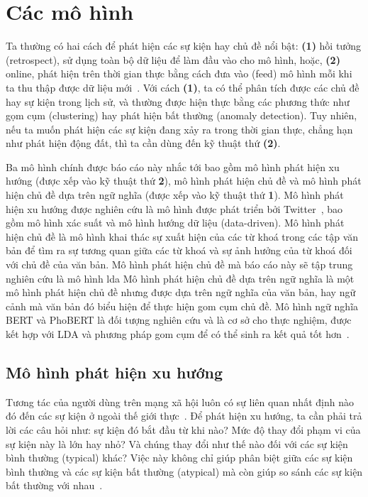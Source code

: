 \chapter{Các mô hình}
\label{chap:models}

Ta thường có hai cách để phát hiện các sự kiện hay chủ đề nổi bật: \textbf{(1)} hồi tưởng (retrospect), sử dụng toàn bộ dữ liệu để làm đầu vào cho mô hình, hoặc, \textbf{(2)} online, phát hiện trên thời gian thực bằng cách đưa vào (feed) mô hình mỗi khi ta thu thập được dữ liệu mới~\cite{lauOnlineTrendAnalysis2012}. Với cách \textbf{(1)}, ta có thể phân tích được các chủ đề hay sự kiện trong lịch sử, và thường được hiện thực bằng các phương thức như gọm cụm (clustering) hay phát hiện bất thường (anomaly detection). Tuy nhiên, nếu ta muốn phát hiện các sự kiện đang xảy ra trong thời gian thực, chẳng hạn như phát hiện động đất, thì ta cần dùng đến kỹ thuật thứ \textbf{(2)}.

Ba mô hình chính được báo cáo này nhắc tới bao gồm mô hình phát hiện xu hướng (được xếp vào kỹ thuật thứ \textbf{2}), mô hình phát hiện chủ đề và mô hình phát hiện chủ đề dựa trên ngữ nghĩa (được xếp vào kỹ thuật thứ \textbf{1}).  Mô hình phát hiện xu hướng được nghiên cứu là mô hình được phát triển bởi Twitter~\cite{hendricksonTrendDetectionSocial2015}, bao gồm mô hình xác suất và mô hình hướng dữ liệu (data-driven). Mô hình phát hiện chủ đề là mô hình khai thác sự xuất hiện của các từ khoá trong các tập văn bản để tìm ra sự tương quan giữa các từ khoá và sự ảnh hưởng của từ khoá đối với chủ đề của văn bản. Mô hình phát hiện chủ đề mà báo cáo này sẽ tập trung nghiên cứu là mô hình \acrfull{lda} Mô hình phát hiện chủ đề dựa trên ngữ nghĩa là một mô hình phát hiện chủ đề nhưng được dựa trên ngữ nghĩa của văn bản, hay ngữ cảnh mà văn bản đó biểu hiện để thực hiện gom cụm chủ đề. Mô hình ngữ nghĩa BERT và PhoBERT là đối tượng nghiên cứu và là cơ sở cho thực nghiệm, được kết hợp với LDA và phương pháp gom cụm để có thể sinh ra kết quả tốt hơn~\cite{lamGomCumVan2021}.



\section{Mô hình phát hiện xu hướng}
Tương tác của người dùng trên mạng xã hội luôn có sự liên quan nhất định nào đó đến các sự kiện ở ngoài thế giới thực~\cite{hendricksonTrendDetectionSocial2015}. Để phát hiện xu hướng, ta cần phải trả lời các câu hỏi như: sự kiện đó bắt đầu từ khi nào? Mức độ thay đổi phạm vi của sự kiện này là lớn hay nhỏ? Và chúng thay đổi như thế nào đối với các sự kiện bình thường (typical) khác? Việc này không chỉ giúp phân biệt giữa các sự kiện bình thường và các sự kiện bất thường (atypical) mà còn giúp so sánh các sự kiện bất thường với nhau~\cite{hendricksonTrendDetectionSocial2015}.

